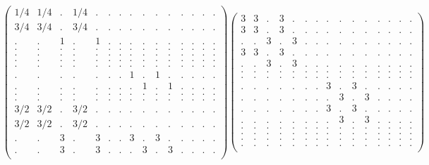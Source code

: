 \documentclass[12pt,a4paper]{amsart}
\begin{document}
\begin{align*}
\left(\begin{array}{rrrrrrrrrrrrrrr}%
1/4&1/4&.&1/4&.&.&.&.&.&.&.&.&.&.&.\\%
3/4&3/4&.&3/4&.&.&.&.&.&.&.&.&.&.&.\\%
.&.&1&.&1&.&.&.&.&.&.&.&.&.&.\\%
.&.&.&.&.&.&.&.&.&.&.&.&.&.&.\\%
.&.&.&.&.&.&.&.&.&.&.&.&.&.&.\\%
.&.&.&.&.&.&.&.&.&.&.&.&.&.&.\\%
.&.&.&.&.&.&.&.&.&.&.&.&.&.&.\\%
.&.&.&.&.&.&.&1&.&1&.&.&.&.&.\\%
.&.&.&.&.&.&.&.&1&.&1&.&.&.&.\\%
.&.&.&.&.&.&.&.&.&.&.&.&.&.&.\\%
.&.&.&.&.&.&.&.&.&.&.&.&.&.&.\\%
3/2&3/2&.&3/2&.&.&.&.&.&.&.&.&.&.&.\\%
3/2&3/2&.&3/2&.&.&.&.&.&.&.&.&.&.&.\\%
.&.&3&.&3&.&.&3&.&3&.&.&.&.&.\\%
.&.&3&.&3&.&.&.&3&.&3&.&.&.&.\\%
\end{array}\right)%
\left(\begin{array}{rrrrrrrrrrrrrrr}%
3&3&.&3&.&.&.&.&.&.&.&.&.&.&.\\%
3&3&.&3&.&.&.&.&.&.&.&.&.&.&.\\%
.&.&3&.&3&.&.&.&.&.&.&.&.&.&.\\%
3&3&.&3&.&.&.&.&.&.&.&.&.&.&.\\%
.&.&3&.&3&.&.&.&.&.&.&.&.&.&.\\%
.&.&.&.&.&.&.&.&.&.&.&.&.&.&.\\%
.&.&.&.&.&.&.&.&.&.&.&.&.&.&.\\%
.&.&.&.&.&.&.&3&.&3&.&.&.&.&.\\%
.&.&.&.&.&.&.&.&3&.&3&.&.&.&.\\%
.&.&.&.&.&.&.&3&.&3&.&.&.&.&.\\%
.&.&.&.&.&.&.&.&3&.&3&.&.&.&.\\%
.&.&.&.&.&.&.&.&.&.&.&.&.&.&.\\%
.&.&.&.&.&.&.&.&.&.&.&.&.&.&.\\%
.&.&.&.&.&.&.&.&.&.&.&.&.&.&.\\%
.&.&.&.&.&.&.&.&.&.&.&.&.&.&.\\%
\end{array}\right)%
\end{align*}
\end{document}
